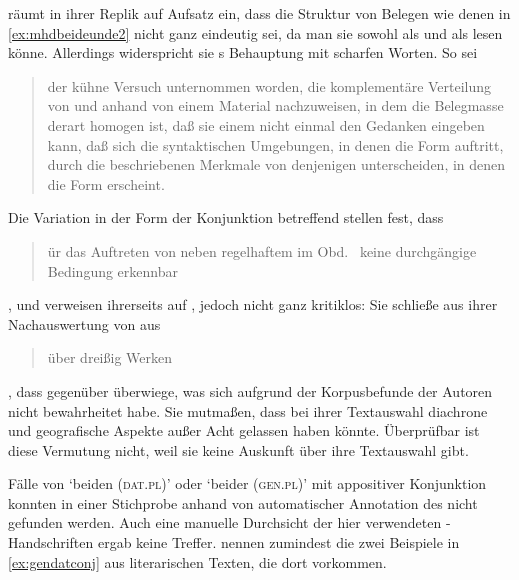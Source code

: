 \citet[187]{gjelsten1980} räumt in ihrer Replik auf 
Aufsatz ein, dass die Struktur von Belegen wie denen in \cref{ex:mhdbeideunde2}
nicht ganz eindeutig sei, da man sie sowohl als  und als
 lesen könne. Allerdings widerspricht sie
\citeauthor{askedal1974}s Behauptung mit scharfen Worten. So sei
\blockcquote[196]{gjelsten1980}{der kühne Versuch unternommen worden, die
komplementäre Verteilung von  und  anhand von einem
Material nachzuweisen, in dem die Belegmasse derart homogen ist, daß sie einem
nicht einmal den Gedanken eingeben kann, daß sich die syntaktischen Umgebungen,
in denen die Form  auftritt, durch die beschriebenen Merkmale von
denjenigen unterscheiden, in denen die Form  erscheint.}

Die Variation in der Form der Konjunktion betreffend stellen \citet[628]{ksw2}
fest, dass \blockquote{ür das Auftreten von  neben
regelhaftem  im Obd.\ \textelp{} keine durchgängige Bedingung
erkennbar }, und verweisen ihrerseits auf \citet{gjelsten1980},
jedoch nicht ganz kritiklos: Sie schließe aus ihrer Nachauswertung von
 aus
\blockcquote[198]{gjelsten1980}{über dreißig Werken}, dass 
gegenüber  überwiege, was sich aufgrund der Korpusbefunde der
Autoren nicht bewahrheitet habe. Sie mutmaßen, dass \citeauthor{gjelsten1980}
bei ihrer Textauswahl diachrone und geografische Aspekte außer Acht gelassen
haben könnte. Überprüfbar ist diese Vermutung nicht, weil sie keine Auskunft
über ihre Textauswahl gibt.

Fälle von  `beiden (\textsc{dat.pl})' oder 
`beider (\textsc{gen.pl})' mit appositiver Konjunktion konnten in einer
Stichprobe anhand von  automatischer Annotation des
\CAO{} nicht gefunden werden. Auch eine manuelle Durchsicht der hier
verwendeten \KC{}-Handschriften ergab keine Treffer. \citet[626]{ksw2}
nennen zumindest die zwei Beispiele in \cref{ex:gendatconj} aus literarischen
Texten, die dort  vorkommen.

